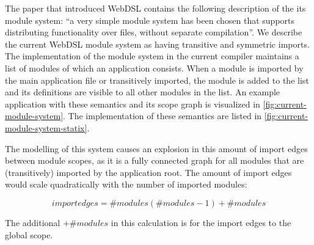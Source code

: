     The paper that introduced WebDSL \autocite{Visser2007} contains the following description of the its module system: {``a very simple module system has been chosen that supports distributing functionality over files, without separate compilation''}. We describe the current WebDSL module system as having transitive and symmetric imports. The implementation of the module system in the current compiler maintains a list of modules of which an application consists. When a module is imported by the main application file or transitively imported, the module is added to the list and its definitions are visible to all other modules in the list. An example application with these semantics and its scope graph is visualized in \cref{fig:current-module-system}. The implementation of these semantics are listed in \cref{fig:current-module-system-statix}.

    The modelling of this system causes an explosion in this amount of import edges between module scopes, as it is a fully connected graph for all modules that are (transitively) imported by the application root. The amount of import edges would scale quadratically with the number of imported modules:

    $$import edges = \#modules(\#modules - 1) + \#modules$$

    The additional $+ \#modules$ in this calculation is for the import edges to the global scope.

